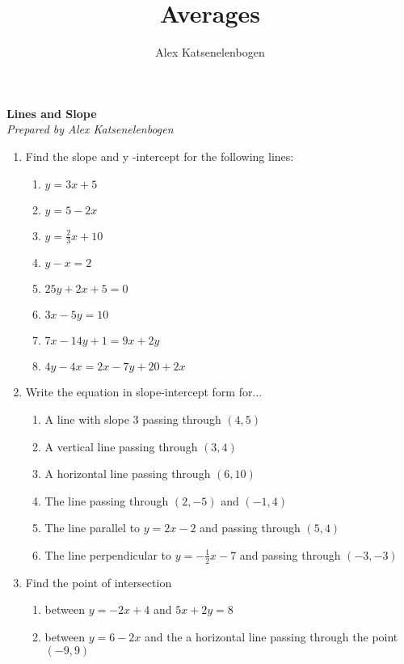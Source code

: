 \documentclass{article}
\title{Averages}
\author{Alex Katsenelenbogen}
\begin{document}
\begin{center}
      \Large\textbf{Lines and Slope}\\
      \large\textit{Prepared by Alex Katsenelenbogen}
   \end{center}

\begin{enumerate}

\item
Find the slope and y -intercept for the following lines:
\begin{enumerate}

\item $y = 3x + 5$
\item $y = 5 - 2x$
\item $y = \frac{2}{3}x + 10$
\item $y - x = 2$
\item $25y + 2x + 5 = 0$
\item $3x - 5y = 10$
\item $7x - 14y + 1 = 9x + 2y$
\item $4y - 4x = 2x -7y +20 + 2x$
\end{enumerate}

\item 
Write the equation in slope-intercept form for...
\begin{enumerate}
\item A line with slope $3$ passing through  $(4,5)$
\item A vertical line passing through $(3, 4)$
\item A horizontal line passing through $(6, 10)$
\item The line passing through $(2, -5)$ and $(-1, 4)$
\item The line parallel to $y = 2x - 2$ and passing through $(5, 4)$
\item The line perpendicular to $y = -\frac{1}{2}x -7$ and passing through $(-3, -3)$
\end{enumerate}
\item  Find the point of intersection
\begin{enumerate}
\item between $y = -2x + 4$ and $5x + 2y = 8$
\item between $y = 6 - 2x$ and the a horizontal line passing
through the point $(-9, 9)$
\end{enumerate}
\end{enumerate}
\end{document}
